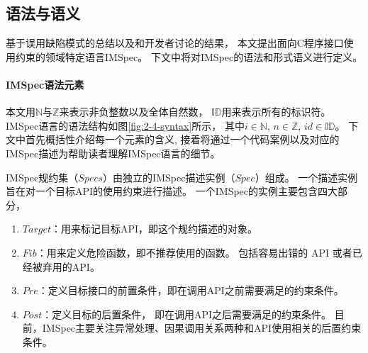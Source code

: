 \newcommand{\Nat}{\mathbb{N}}
\newcommand{\Int}{\mathbb{Z}}
\newcommand{\ID}{\mathbb{ID}}
\newcommand{\Cond}{\mathit{Cond}}
\newcommand{\true}{\texttt{true}}
\newcommand{\Pre}{\mathit{Pre}}
\newcommand{\Post}{\mathit{Post}}
\newcommand{\Fib}{\mathit{Fib}}
\newcommand{\Ret}{\mathit{Return}}
\newcommand{\ReturnFun}[1]{\texttt{\textbf{RETURN}(}#1\texttt{)}}
\newcommand{\Call}{\mathit{Call}}
\newcommand{\CallFun}[1]{\texttt{\textbf{Call}(}#1\texttt{)}}
\newcommand{\NULL}{\texttt{\textbf{NULL}}}
\newcommand{\FunName}{\mathit{FunName}}
\newcommand{\FunSig}{\mathit{FunSig}}
\newcommand{\Action}{\mathit{Action}}
\newcommand{\Arg}{\mathit{Arg}}
\newcommand{\Opd}{\mathit{Opd}}
\newcommand{\MemberOp}{\mathit{MemberOp}}
\newcommand{\CmpOp}{\mathit{CmpOp}}
\newcommand{\UnOp}{\mathit{UnOp}}
\newcommand{\Set}{\mathit{Set}}
\newcommand{\Type}{\mathit{Type}}
\newcommand{\IN}{\texttt{IN}}
\newcommand{\NOTIN}{\texttt{NOTIN}}
\newcommand{\LEN}{\texttt{LEN}}
\newcommand{\TYPE}{\texttt{TYPE}}
\newcommand{\MEMTYPE}{\texttt{MEMTYPE}}
\newcommand{\myid}{\mathit{id}}
\newcommand{\Target}{\mathit{Target}}
\newcommand{\Spec}{\mathit{Spec}}
\newcommand{\Specs}{\mathit{Specs}}

\subsection{语法与语义}
基于误用缺陷模式的总结以及和开发者讨论的结果，
本文提出面向C程序接口使用约束的领域特定语言IMSpec。
下文中将对IMSpec的语法和形式语义进行定义。

\paragraph{IMSpec语法元素}
本文用$\Nat$与$\Int$来表示非负整数以及全体自然数，
$\ID$用来表示所有的标识符。
IMSpec语言的语法结构如图\ref{fig:2-4-syntax}所示，
其中$i\in\Nat$, $n\in\Int$, $id \in \ID$。
下文中首先概括性介绍每一个元素的含义,
接着将通过一个代码案例以及对应的IMSpec描述为帮助读者理解IMSpec语言的细节。

IMSpec规约集（$\Specs$）由独立的IMSpec描述实例（$\Spec$）组成。
一个描述实例旨在对一个目标API的使用约束进行描述。
一个IMSpec的实例主要包含四大部分，
\begin{enumerate}
	\item $\Target$：用来标记目标API，即这个规约描述的对象。
	\item $\Fib$：用来定义危险函数，即不推荐使用的函数。
	包括容易出错的 API 或者已经被弃用的API。
	\item $\Pre$：定义目标接口的前置条件，即在调用API之前需要满足的约束条件。
	\item $\Post$：定义目标的后置条件，
	即在调用API之后需要满足的约束条件。
	目前，IMSpec主要关注异常处理、因果调用关系两种和API使用相关的后置约束条件。
\end{enumerate}

